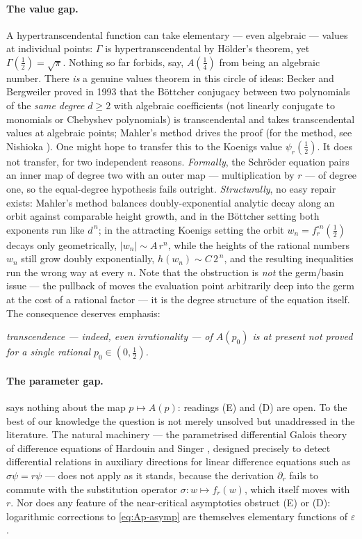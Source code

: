 \documentclass[11pt,a4paper]{article}
\theoremstyle{plain}
\theoremstyle{definition}
\begin{document}
\paragraph{The value gap.}
A hypertranscendental function can take elementary --- even algebraic --- values at individual points: $\Gamma$ is hypertranscendental by H\"older's theorem, yet $\Gamma(\tfrac12)=\sqrt{\pi}$. Nothing so far forbids, say, $A(\tfrac14)$ from being an algebraic number. There \emph{is} a genuine values theorem in this circle of ideas: Becker and Bergweiler proved in 1993 \cite{Becker1993} that the B\"ottcher conjugacy between two polynomials of the \emph{same degree} $d\ge2$ with algebraic coefficients (not linearly conjugate to monomials or Chebyshev polynomials) is transcendental and takes transcendental values at algebraic points; Mahler's method drives the proof (for the method, see Nishioka \cite{Nishioka1996}). One might hope to transfer this to the Koenigs value $\psi_r(\tfrac12)$. It does not transfer, for two independent reasons. \emph{Formally}, the Schr\"oder equation pairs an inner map of degree two with an outer map --- multiplication by $r$ --- of degree one, so the equal-degree hypothesis fails outright. \emph{Structurally}, no easy repair exists: Mahler's method balances doubly-exponential analytic decay along an orbit against comparable height growth, and in the B\"ottcher setting both exponents run like $d^{\,n}$; in the attracting Koenigs setting the orbit $w_n=f_r^{\circ n}(\tfrac12)$ decays only geometrically, $|w_n|\sim A\,r^{n}$, while the heights of the rational numbers $w_n$ still grow doubly exponentially, $h(w_n)\sim C\,2^{\,n}$, and the resulting inequalities run the wrong way at every $n$. Note that the obstruction is \emph{not} the germ/basin issue --- the pullback of  moves the evaluation point arbitrarily deep into the germ at the cost of a rational factor --- it is the degree structure of the equation itself. The consequence deserves emphasis:
\begin{center}
\emph{transcendence --- indeed, even irrationality --- of $A(p_0)$ is at present not proved\\ for a single rational $p_0\in(0,\tfrac12)$.}
\end{center}

\paragraph{The parameter gap.}
 says nothing about the map $p\mapsto A(p)$: readings (E) and (D) are open. To the best of our knowledge the question is not merely unsolved but unaddressed in the literature. The natural machinery --- the parametrised differential Galois theory of difference equations of Hardouin and Singer \cite{HardouinSinger2008}, designed precisely to detect differential relations in auxiliary directions for linear difference equations such as $\sigma\psi=r\psi$ --- does not apply as it stands, because the derivation $\partial_r$ fails to commute with the substitution operator $\sigma\colon w\mapsto f_r(w)$, which itself moves with $r$. Nor does any feature of the near-critical asymptotics obstruct (E) or (D): logarithmic corrections to \eqref{eq:Ap-asymp} are themselves elementary functions of $\varepsilon$.
\end{document}
